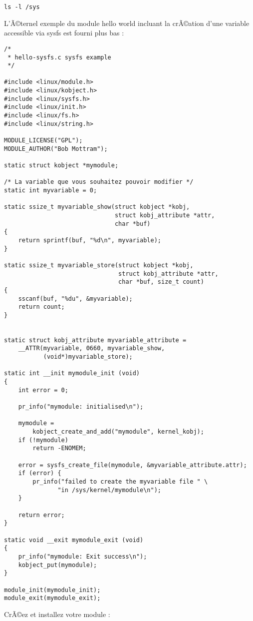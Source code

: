 \documentclass[11pt]{article}
\begin{document}
\begin{verbatim}
ls -l /sys
\end{verbatim}

L'Ã©ternel exemple du module hello world incluant la crÃ©ation d'une variable accessible via sysfs est fourni plus bas :

\begin{verbatim}
/*
 * hello-sysfs.c sysfs example
 */

#include <linux/module.h>
#include <linux/kobject.h>
#include <linux/sysfs.h>
#include <linux/init.h>
#include <linux/fs.h>
#include <linux/string.h>

MODULE_LICENSE("GPL");
MODULE_AUTHOR("Bob Mottram");

static struct kobject *mymodule;

/* La variable que vous souhaitez pouvoir modifier */
static int myvariable = 0;

static ssize_t myvariable_show(struct kobject *kobj,
                               struct kobj_attribute *attr,
                               char *buf)
{
    return sprintf(buf, "%d\n", myvariable);
}

static ssize_t myvariable_store(struct kobject *kobj,
                                struct kobj_attribute *attr,
                                char *buf, size_t count)
{
    sscanf(buf, "%du", &myvariable);
    return count;
}


static struct kobj_attribute myvariable_attribute =
    __ATTR(myvariable, 0660, myvariable_show,
           (void*)myvariable_store);

static int __init mymodule_init (void)
{
    int error = 0;

    pr_info("mymodule: initialised\n");

    mymodule =
        kobject_create_and_add("mymodule", kernel_kobj);
    if (!mymodule)
        return -ENOMEM;

    error = sysfs_create_file(mymodule, &myvariable_attribute.attr);
    if (error) {
        pr_info("failed to create the myvariable file " \
               "in /sys/kernel/mymodule\n");
    }

    return error;
}

static void __exit mymodule_exit (void)
{
    pr_info("mymodule: Exit success\n");
    kobject_put(mymodule);
}

module_init(mymodule_init);
module_exit(mymodule_exit);
\end{verbatim}

CrÃ©ez et installez votre module :
\end{document}
